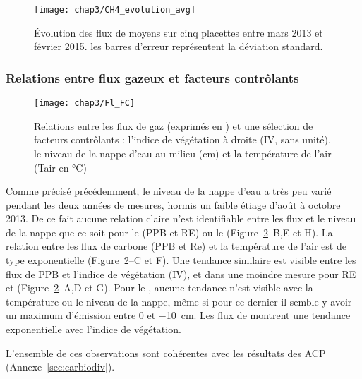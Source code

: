 \begin{figure}
\centering
\texttt{[image: chap3/CH4\_evolution\_avg]}
\caption{Évolution des flux de \chh moyens sur cinq placettes entre mars 2013 et février 2015. les barres d'erreur représentent la déviation standard.}
\label{fig:CH4_evolution_avg}
\end{figure}



\subsubsection{Relations entre flux gazeux et facteurs contrôlants}

\begin{figure}[!htb]
\centering
\texttt{[image: chap3/Fl\_FC]}
\caption{Relations entre les flux de gaz (exprimés en \si{\uml}) et une sélection de facteurs contrôlants : l'indice de végétation à droite (IV, sans unité), le niveau de la nappe d'eau au milieu (cm) et la température de l'air (Tair en \si{\degreeCelsius})}
\label{fig:Fl_FC}
\end{figure}

Comme précisé précédemment, le niveau de la nappe d'eau a très peu varié pendant les deux années de mesures, hormis un faible étiage d'août à octobre 2013.
De ce fait aucune relation claire n'est identifiable entre les flux et le niveau de la nappe que ce soit pour le \coo (PPB et RE) ou le \chh (Figure~\ref{fig:Fl_FC}--B,E et H).
La relation entre les flux de carbone (PPB et Re) et la température de l'air est de type exponentielle (Figure~\ref{fig:Fl_FC}--C et F).
Une tendance similaire est visible entre les flux de PPB et l'indice de végétation (IV), et dans une moindre mesure pour RE et \chh (Figure~\ref{fig:Fl_FC}--A,D et G).
Pour le \chh, aucune tendance n'est visible avec la température ou le niveau de la nappe, même si pour ce dernier il semble y avoir un maximum d'émission entre 0 et \SI{-10}{\centi\metre}.
Les flux de \chh montrent une tendance exponentielle avec l'indice de végétation.

L'ensemble de ces observations sont cohérentes avec les résultats des ACP (Annexe~\ref{sec:carbiodiv}).

